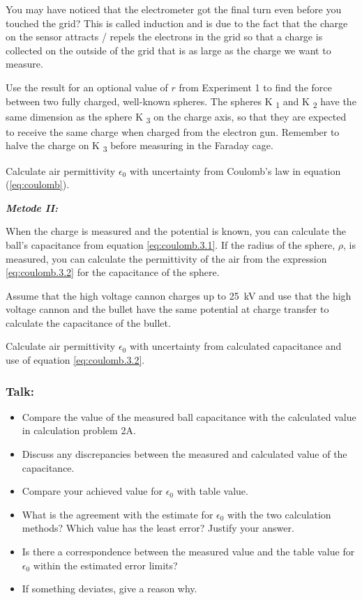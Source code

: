 \documentclass[../Elmag-labhefte-2022.tex]{subfiles}
\begin{document}
You may have noticed that the electrometer got the final turn even before you touched the grid? This is called induction and is due to the fact that the charge on the sensor attracts / repels the electrons in the grid so that a charge is collected on the outside of the grid that is as large as the charge we want to measure.

Use the result for an optional value of $r$ from Experiment 1 to find the force between two fully charged, well-known spheres. The spheres K \textsubscript{1} and K \textsubscript{2} have the same dimension as the sphere K \textsubscript{3} on the charge axis, so that they are expected to receive the same charge when charged from the electron gun. Remember to halve the charge on K \textsubscript{3} before measuring in the Faraday cage.

{\itsf Calculate air permittivity $\epsilon_0$ with uncertainty from Coulomb's law in equation (\ref{eq:coulomb}).}

\textbf{\emph{Metode II:}}

When the charge is measured and the potential is known, you can calculate the ball's capacitance from equation \eqref{eq:coulomb.3.1}. If the radius of the sphere, $\rho$, is measured, you can calculate the permittivity of the air from the expression \eqref{eq:coulomb.3.2} for the capacitance of the sphere.

Assume that the high voltage cannon charges up to \SI{25}{\kilo\volt} and use that the high voltage cannon and the bullet have the same potential at charge transfer to calculate the capacitance of the bullet.

{\itsf   Calculate air permittivity $\epsilon_0$ with uncertainty from calculated capacitance and use of equation \eqref{eq:coulomb.3.2}.}

\subsubsection{Talk:}
\begin{itemize}
    \item Compare the value of the measured ball capacitance with the calculated value in calculation problem 2A.
    \item Discuss any discrepancies between the measured and calculated value of the capacitance.
     \item Compare your achieved value for $\epsilon_0$ with table value.
    \item What is the agreement with the estimate for $\epsilon_0$ with the two calculation methods? Which value has the least error? Justify your answer.
    \item Is there a correspondence between the measured value and the table value for $\epsilon_0$ within the estimated error limits?
    \item If something deviates, give a reason why.
\end{itemize}
\end{document}
